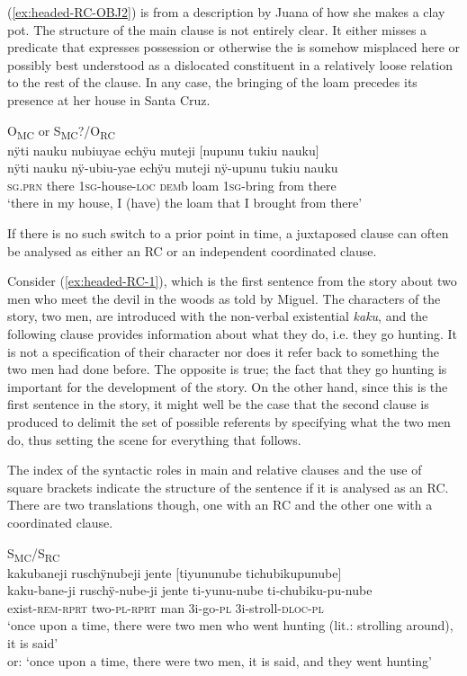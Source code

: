 (\ref{ex:headed-RC-OBJ2}) is from a description by Juana of how she makes a clay pot. The structure of the main clause is not entirely clear. It either misses a predicate that expresses possession or otherwise the  is somehow misplaced here or possibly best understood as a dislocated constituent in a relatively loose relation to the rest of the clause. In any case, the bringing of the loam precedes its presence at her house in Santa Cruz.

\ea\label{ex:headed-RC-OBJ2}
\begingl
\glpreamble \textup{O\textsubscript{MC} or S\textsubscript{MC}?/O\textsubscript{RC}}\\nÿti nauku nubiuyae echÿu muteji \textup{[}nupunu tukiu nauku\textup{]}\\
\gla nÿti nauku nÿ-ubiu-yae echÿu muteji nÿ-upunu tukiu nauku\\
\textsc{sg.prn} there 1\textsc{sg}-house-\textsc{loc} \textsc{dem}b loam 1\textsc{sg}-bring from there\\
\glft ‘there in my house, I (have) the loam that I brought from there’
\endgl
\trailingcitation{[jxx-d110923l-1.01]}
\xe

If there is no such switch to a prior point in time, a juxtaposed clause can often be analysed as either an RC or an independent coordinated clause.

Consider (\ref{ex:headed-RC-1}), which is the first sentence from the story about two men who meet the devil in the woods as told by Miguel. The characters of the story, two men, are introduced with the non-verbal existential  \textit{kaku}, and the following clause provides information about what they do, i.e. they go hunting. It is not a specification of their character nor does it refer back to something the two men had done before. The opposite is true; the fact that they go hunting is important for the development of the story. On the other hand, since this is the first sentence in the story, it might well be the case that the second clause is produced to delimit the set of possible referents by specifying what the two men do, thus setting the scene for everything that follows. 

The index of the syntactic roles in main and relative clauses and the use of square brackets indicate the structure of the sentence if it is analysed as an RC. There are two translations though, one with an RC and the other one with a coordinated clause.

\newpage
\ea\label{ex:headed-RC-1}
\begingl
\glpreamble \textup{S\textsubscript{MC}/S\textsubscript{RC}}\\kakubaneji ruschÿnubeji jente \textup{[}tiyununube tichubikupunube\textup{]}\\
\gla kaku-bane-ji ruschÿ-nube-ji jente ti-yunu-nube ti-chubiku-pu-nube\\
\glb exist-\textsc{rem}-\textsc{rprt} two-\textsc{pl}-\textsc{rprt} man 3i-go-\textsc{pl} 3i-stroll-\textsc{dloc}-\textsc{pl}\\
\glft ‘once upon a time, there were two men who went hunting (lit.: strolling around), it is said’\\or: ‘once upon a time, there were two men, it is said, and they went hunting’
\endgl
\trailingcitation{[mxx-n101017s-1.014]}
\xe


